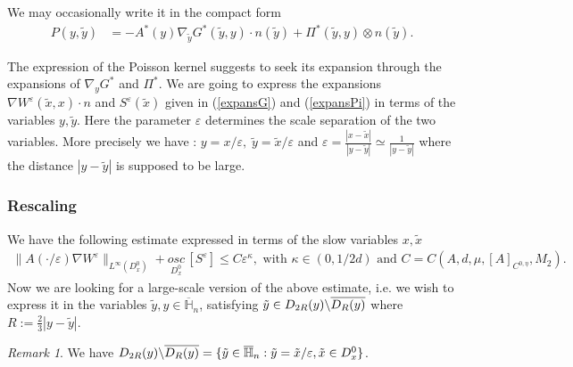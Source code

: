 \documentclass[11pt, reqno]{amsart}
\theoremstyle{definition}
\theoremstyle{remark}
\newtheorem{remark}[theorem]{Remark}
\numberwithin{equation}{section}
\newcommand{\bs}{\symbol{92}}
\begin{document}
	\noindent	We may occasionally write it in the compact form
	\begin{align*}
		P(y,\tilde{y})
		&=-A^*(y)\nabla_{\!\tilde{y}}  G^*(\tilde{y},y) \cdot n (\tilde{y})+  \Pi^*(\tilde{y},y ) \otimes n(\tilde{y}).
	\end{align*}
	
	\noindent 	The expression of the Poisson kernel suggests to seek its expansion through the expansions of $\nabla_{\!\!y}  G^*$ and  $\Pi^*$. We are going to express the expansions  $\nabla 	W^{\varepsilon} (\tilde{x},x)\cdot n$ and  $S^{\varepsilon}(\tilde{x})$ given in (\ref{expansG}) and (\ref{expansPi}) in terms of the variables $y,\tilde{y}$. Here the parameter $\varepsilon$ determines the  scale separation of the two variables. More precisely we have : $y=x/\varepsilon,\; \tilde{y}= \tilde{x}/\varepsilon$ and  $\varepsilon=\frac{|x-\tilde{x}|}{|y-\tilde{y}|} \simeq \frac{1}{|y-\tilde{y}|}$ where the distance $|y-\tilde{y}|$ is supposed to be large.
	
	\subsubsection{Rescaling} 
	
	\noindent	We have the following estimate expressed in terms of the slow variables $x, \tilde{x}$
	\begin{align*}
		\|A(\cdot/\varepsilon)\nabla W^{\varepsilon}\|_{L^\infty(D_x^0)}  + \underset{D_x^0}{osc} \,[S^{\varepsilon}]\leq   C \varepsilon^\kappa, \mbox{ with } \kappa\in (0, 1/2d) \mbox{ and } C=C(A, d, \mu, [A]_{C^{0,\eta}},M_2).	\end{align*}
	\noindent Now we are looking for a large-scale version of the above estimate, i.e. we wish to express it in the variables $\tilde{y},y \in \overline{\mathbb{H}}_n$, satisfying $\tilde{y}\in D_{2R}(y)\bs \overline{D_R(y)}$ where $R:=\frac{2}{3}|y-\tilde{y}|.$
	
	
	\begin{remark} We have
		$D_{2R}(y) \bs \overline{D_R(y)}=\{\tilde{y}\in \overline{\mathbb{H}}_n:  \tilde{y} =\tilde{x}/ \varepsilon,  \tilde{x}\in D_x^0\}   $.
	\end{remark}
	
\end{document}
